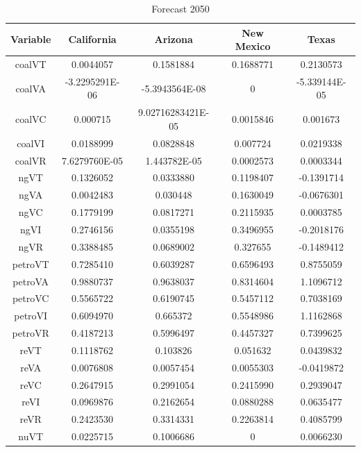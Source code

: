 \documentclass{mcmthesis}
\begin{document}
\begin{table}[!htbp]
\centering
\caption{Forecast 2050}\label{tab:predict 2050}
\begin{tabular}{ccccc}
\toprule
Variable& California& Arizona& New Mexico& Texas\\
\midrule
coalVT	&	0.0044057	&	0.1581884	&	0.1688771&	0.2130573	\\
coalVA	&	-3.2295291E-06	&	-5.3943564E-08	&	0	&	-5.339144E-05	\\
coalVC	&	0.000715	&	9.02716283421E-05	&	0.0015846	&	0.001673	\\
coalVI	&	0.0188999	&	0.0828848	&	0.007724	&	0.0219338	\\
coalVR	&	7.6279760E-05	&	1.443782E-05	&	0.0002573	&	0.0003344	\\
ngVT	&	0.1326052	&	0.0333880	&	0.1198407	&	-0.1391714	\\
ngVA	&	0.0042483	&	0.030448	&	0.1630049	&	-0.0676301	\\
ngVC	&	0.1779199	&	0.0817271	&	0.2115935	&	0.0003785	\\
ngVI	&	0.2746156	&	0.0355198	&	0.3496955	&	-0.2018176	\\
ngVR	&	0.3388485	&	0.0689002	&	0.327655	&	-0.1489412	\\
petroVT	&	0.7285410	&	0.6039287	&	0.6596493	&	0.8755059	\\
petroVA	&	0.9880737	&	0.9638037	&	0.8314604	&	1.1096712	\\
petroVC	&	0.5565722	&	0.6190745	&	0.5457112	&	0.7038169	\\
petroVI	&	0.6094970	&	0.665372	&	0.5548986	&	1.1162868	\\
petroVR	&	0.4187213	&	0.5996497	&	0.4457327	&	0.7399625	\\
reVT	&	0.1118762	&	0.103826	&	0.051632	&	0.0439832	\\
reVA	&	0.0076808	&	0.0057454	&	0.0055303	&	-0.0419872	\\
reVC	&	0.2647915	&	0.2991054	&	0.2415990	&	0.2939047	\\
reVI	&	0.0969876	&	0.2162654	&	0.0880288	&	0.0635477	\\
reVR	&	0.2423530	&	0.3314331	&	0.2263814	&	0.4085799	\\
nuVT	&	0.0225715	&	0.1006686	&	0	&	0.0066230	\\
\bottomrule
\end{tabular}
\end{table}
\end{document}
